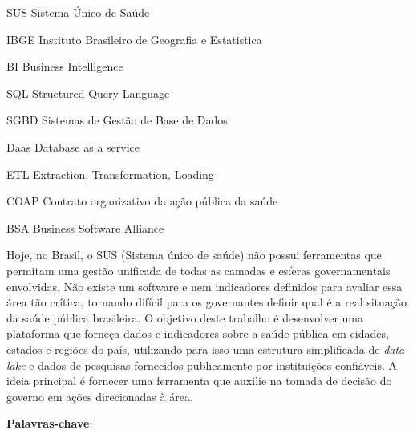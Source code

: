 \documentclass[
	12pt,				%
	openright,			%
	oneside,			%
	a4paper,			%
	chapter=TITLE,		%
	section=TITLE,		%
	subsection=TITLE,	%
	subsubsection=TITLE,%
	english,			%
	brazil				%
	]{abntex2}
\theoremstyle{definition}
\begin{document}
\begin{siglas}
  \item[SUS] Sistema Único de Saúde
  \item[IBGE] Instituto Brasileiro de Geografia e Estatistica
  \item[BI] Business Intelligence
  \item[SQL] Structured Query Language
  \item[SGBD] Sistemas de Gestão de Base de Dados
  \item[Daas] Database as a service
  \item[ETL] Extraction, Transformation, Loading
  \item[COAP] Contrato organizativo da ação pública da saúde
  \item[BSA] Business Software Alliance
\end{siglas}


\setlength{\absparsep}{18pt} %
\begin{resumo}

Hoje, no Brasil, o SUS (Sistema único de saúde) não possui ferramentas que permitam uma gestão unificada de todas as camadas e esferas governamentais envolvidas. Não existe um software e nem indicadores definidos para avaliar essa área tão crítica, tornando difícil para os governantes definir qual é a real situação da saúde pública brasileira.
O objetivo deste trabalho é desenvolver uma plataforma que forneça dados e indicadores sobre a saúde pública em cidades, estados e regiões do país, utilizando para isso uma estrutura simplificada de \textit{data lake} e dados de pesquisas fornecidos publicamente por instituições confiáveis. A ideia principal é fornecer uma ferramenta que auxilie na tomada de decisão do governo em ações direcionadas à área.

 \textbf{Palavras-chave}: \imprimirpalavraschave
\end{resumo}
\end{document}
